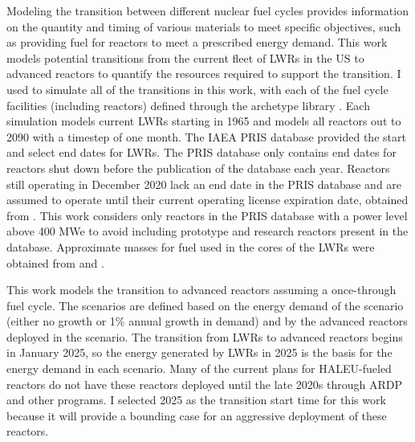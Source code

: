 Modeling the transition between different nuclear fuel cycles provides 
information on the quantity and timing of various materials to meet 
specific objectives, such as providing fuel for reactors to meet a 
prescribed energy demand. 
This work models potential transitions from the 
current fleet of \glspl{LWR} in the US to advanced reactors to quantify the 
resources required to support the transition. I used 
\Cyclus \cite{huff_fundamental_2016} to simulate all of the transitions 
in this 
work, with each of the fuel cycle facilities (including reactors) defined 
through the \Cycamore archetype library \cite{carlsen_cycamore_2014}. Each 
simulation models current 
\glspl{LWR} starting in 1965 and models all reactors out to 2090 with a timestep 
of one month. The \gls{IAEA} \gls{PRIS} database \cite{noauthor_power_1989} 
provided the start and select end dates for \glspl{LWR}. The \gls{PRIS} database 
only contains end dates for reactors shut down before the publication of the 
database each year. Reactors still operating in December 2020  
lack an end date in the \gls{PRIS} database and are assumed to operate 
until 
their current operating license expiration date, obtained from 
\cite{nuclear_energy_institute_us_2021}. This work considers only 
reactors in the \gls{PRIS} database with a power level above 400 MWe 
to avoid including prototype and research reactors present in the database. 
Approximate masses for fuel used in the cores of the \glspl{LWR} were obtained 
from \cite{todreas_nuclear_2012} and \cite{cacuci_handbook_2010}. 

This work models the transition to advanced reactors assuming a 
once-through fuel cycle. The scenarios are defined based 
on the energy demand 
of the scenario (either no growth or 1\% annual growth in demand) and by the 
advanced reactors deployed in the scenario. The transition from \glspl{LWR} 
to advanced reactors begins in January 2025, so the energy generated by 
\glspl{LWR} in 2025 is the basis for the energy demand in each scenario.  
Many of the 
current plans for \gls{HALEU}-fueled reactors do not have these reactors 
deployed until the late 2020s \cite{nichol_current_2021} through \gls{ARDP} 
and other programs. I selected 2025 as the transition 
start time for this work because it will provide a bounding case for 
an aggressive deployment of these reactors. 

